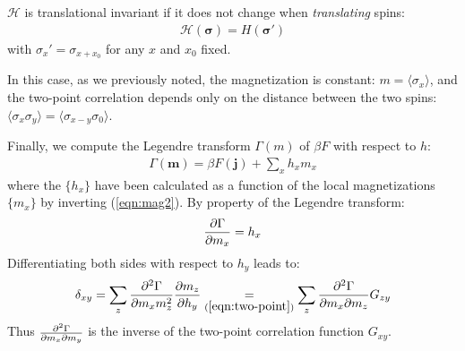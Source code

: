 \documentclass[../template.tex]{subfiles}
\begin{document}
$\mathcal{H}$ is translational invariant if it does not change when \textit{translating} spins: 
\begin{align*}
    \mathcal{H}(\bm{\sigma}) = H(\bm{\sigma}')
\end{align*}
with $\sigma_x' = \sigma_{x+x_0}$ for any $x$ and $x_0$ fixed.

In this case, as we previously noted, the magnetization is constant: $m = \langle \sigma_x \rangle$, and the two-point correlation depends only on the distance between the two spins: $\langle \sigma_x \sigma_y \rangle = \langle \sigma_{x-y} \sigma_0 \rangle$.

\medskip

Finally, we compute the Legendre transform $\Gamma(m)$ of $\beta F$ with respect to $h$:
\begin{align*}
    \Gamma(\bm{m}) = \beta F(\bm{j}) + \sum_x h_x m_x
\end{align*}
where the $\{h_x\}$ have been calculated as a function of the local magnetizations $\{m_x\}$ by inverting (\ref{eqn:mag2}). By property of the Legendre transform:
\begin{align*}
    \pdv{\Gamma}{m_x} = h_x
\end{align*}
Differentiating both sides with respect to $h_y$ leads to:
\begin{align*}
    \delta_{xy} = \sum_z \pdv[2]{\Gamma}{m_x m_z} \pdv{m_z}{h_y} \underset{(\ref{eqn:two-point})}{=} \sum_z \pdv[2]{\Gamma}{m_x}{m_z} G_{zy}
\end{align*}
Thus $\pdv[2]{\Gamma}{m_x}{m_y}$ is the inverse of the two-point correlation function $G_{xy}$. %
\end{document}
